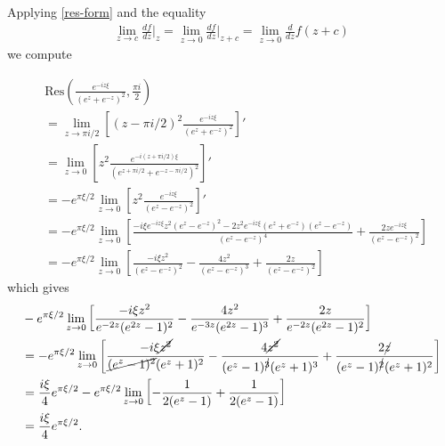 \documentclass[12pt,reqno]{amsart}
\numberwithin{equation}{section}  %
\begin{document}
        Applying \eqref{res-form} and the equality
        \begin{equation*}
        \begin{split}
          \lim_{z \to c} \frac{df}{dz} \Big |_{z} = \lim_{z \to 0}
          \frac{df}{dz}\Big |_{z + c} = \lim_{z \to 0} \frac{d}{dz}f(z + c)
        \end{split}
        \end{equation*}
        we compute

        \begin{equation*}
        \begin{split}
         & \text{Res} \left( \frac{e^{-iz \xi}}{(e^{z} + e^{-z})^{2}}, \frac{\pi i}{2} 
        \right)
        \\
        & = \lim_{z \to \pi i/2} \left[ (z - \pi i /2 )^{2} \frac{e^{-iz
        \xi}}{(e^{z} + e^{-z})^{2}} \right]'
        \\
        & = \lim_{z \to 0} \left[ z^{2} \frac{e^{-i(z + \pi i /2)
        \xi}}{(e^{z + \pi i/2} + e^{-z - \pi i /2})^{2}} \right]'
        \\
        & = -  e^{ \pi \xi/2} \lim_{z \to 0} \left[ z^{2}
        \frac{e^{-i z\xi}}{(e^{z} - e^{-z })^{2}} \right]'
        \\
        & = - e^{ \pi \xi/2} \lim_{z \to 0} \left[ 
        \frac{ - i \xi e^{-iz \xi} z^{2} (e^{z} - e^{-z})^{2} - 2z^{2} e^{-iz
        \xi}(e^{z} + e^{-z})(e^{z} - e^{-z})}{(e^{z} - e^{-z})^{4}} +
        \frac{2z e^{-i z \xi}}{(e^{z} - e^{-z})^{2}}
        \right ]
        \\
        &  = - e^{ \pi \xi/2} \lim_{z \to 0} \left[ \frac{ - i \xi
        z^{2}}{(e^{z} - e^{-z})^{2}} - \frac{4z^{2}}{(e^{z} - e^{-z})^{3}} +
        \frac{2z}{(e^{z} - e^{-z})^{2}}
        \right ]
      \end{split}
        \end{equation*}
        which gives
        \begin{equation*}
        \begin{split}
        & - e^{ \pi \xi/2} \lim_{z \to 0} \left[ \frac{ - i \xi
        z^{2}}{e^{-2z}(e^{2z} - 1)^{2}} - \frac{4z^{2}}{e^{-3z}(e^{2z} - 1)^{3}} +
        \frac{2z}{e^{-2z}(e^{2z} - 1)^{2}}
        \right ]
        \\
        & = - e^{ \pi \xi/2} \lim_{z \to 0} \left[ \frac{ - i \xi
        \cancel{z^{2}}}{\cancel{(e^{z} - 1)^{2}}(e^{z} + 1)^{2}}
        - \frac{4 \cancel{z^{2}}}{(e^{z} -
        1)^{\cancel{3}}(e^{z} + 1)^{3}} +
        \frac{2\cancel{z}}{(e^{z} - 1)^{\cancel{2}}(e^{z}+1)^{2}}
        \right ]
        \\
        & = \frac{i \xi}{4} e^{\pi \xi /2}
        - e^{ \pi \xi/2} \lim_{z \to 0} \left[ -\frac{1}{2(e^{z} -1)} +
        \frac{1}{2(e^{z}-1)} \right]
        \\
        & = \frac{i \xi}{4} e^{\pi \xi /2}.
        \end{split}
        \end{equation*}
\end{document}
